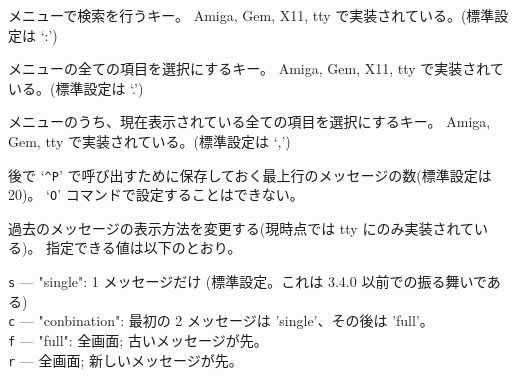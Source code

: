 メニューで検索を行うキー。
Amiga, Gem, X11, tty で実装されている。(標準設定は `:')
\item[\ib{menu\verb+_+select\verb+_+all}]
メニューの全ての項目を選択にするキー。
Amiga, Gem, X11, tty で実装されている。(標準設定は `.')
\item[\ib{menu\verb+_+select\verb+_+page}]
メニューのうち、現在表示されている全ての項目を選択にするキー。
Amiga, Gem, tty で実装されている。(標準設定は `,')
\item[\ib{msghistory}]
後で `{\tt \^{}P}' で呼び出すために保存しておく最上行のメッセージの数(標準設定は 20)。
`{\tt O}' コマンドで設定することはできない。
\item[\ib{msg\verb+_+window}]
過去のメッセージの表示方法を変更する(現時点では tty にのみ実装されている)。
指定できる値は以下のとおり。

{\tt s} --- "single": 1 メッセージだけ (標準設定。これは 3.4.0 以前での振る舞いである)\\
{\tt c} --- "conbination": 最初の 2 メッセージは 'single'、その後は 'full'。\\
{\tt f} --- "full": 全画面; 古いメッセージが先。\\
{\tt r} --- 全画面; 新しいメッセージが先。

